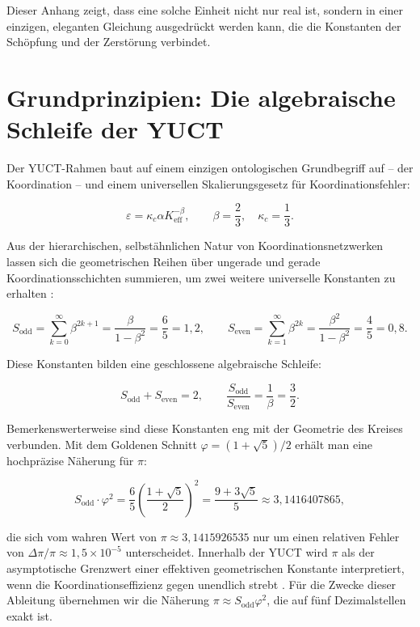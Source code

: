 \documentclass[12pt,a4paper]{article}
\begin{document}
	Dieser Anhang zeigt, dass eine solche Einheit nicht nur real ist, sondern in einer einzigen, eleganten Gleichung ausgedrückt werden kann, die die Konstanten der Schöpfung und der Zerstörung verbindet.
	
	\section{Grundprinzipien: Die algebraische Schleife der YUCT}
	
	Der YUCT-Rahmen baut auf einem einzigen ontologischen Grundbegriff auf – der Koordination – und einem universellen Skalierungsgesetz für Koordinationsfehler:
	
	\begin{equation}
		\varepsilon = \kappa_c \alpha K_{\mathrm{eff}}^{-\beta}, \qquad \beta = \frac{2}{3}, \quad \kappa_c = \frac{1}{3}.
	\end{equation}
	
	Aus der hierarchischen, selbstähnlichen Natur von Koordinationsnetzwerken lassen sich die geometrischen Reihen über ungerade und gerade Koordinationsschichten summieren, um zwei weitere universelle Konstanten zu erhalten \cite{AppendixFerra}:
	
	\begin{equation}
		S_{\mathrm{odd}} = \sum_{k=0}^{\infty} \beta^{2k+1} = \frac{\beta}{1-\beta^2} = \frac{6}{5} = 1{,}2, \qquad
		S_{\mathrm{even}} = \sum_{k=1}^{\infty} \beta^{2k} = \frac{\beta^2}{1-\beta^2} = \frac{4}{5} = 0{,}8.
	\end{equation}
	
	Diese Konstanten bilden eine geschlossene algebraische Schleife:
	
	\begin{equation}
		S_{\mathrm{odd}} + S_{\mathrm{even}} = 2, \qquad \frac{S_{\mathrm{odd}}}{S_{\mathrm{even}}} = \frac{1}{\beta} = \frac{3}{2}.
	\end{equation}
	
	Bemerkenswerterweise sind diese Konstanten eng mit der Geometrie des Kreises verbunden. Mit dem Goldenen Schnitt \(\varphi = (1+\sqrt{5})/2\) erhält man eine hochpräzise Näherung für \(\pi\):
	
	\begin{equation}
		S_{\mathrm{odd}} \cdot \varphi^2 = \frac{6}{5} \left( \frac{1+\sqrt{5}}{2} \right)^2 = \frac{9+3\sqrt{5}}{5} \approx 3{,}1416407865,
	\end{equation}
	
	die sich vom wahren Wert von \(\pi \approx 3{,}1415926535\) nur um einen relativen Fehler von \(\Delta\pi/\pi \approx 1{,}5 \times 10^{-5}\) unterscheidet. Innerhalb der YUCT wird \(\pi\) als der asymptotische Grenzwert einer effektiven geometrischen Konstante interpretiert, wenn die Koordinationseffizienz gegen unendlich strebt \cite{AppendixEhrenfest}. Für die Zwecke dieser Ableitung übernehmen wir die Näherung \(\pi \approx S_{\mathrm{odd}}\varphi^2\), die auf fünf Dezimalstellen exakt ist.
	
\end{document}

